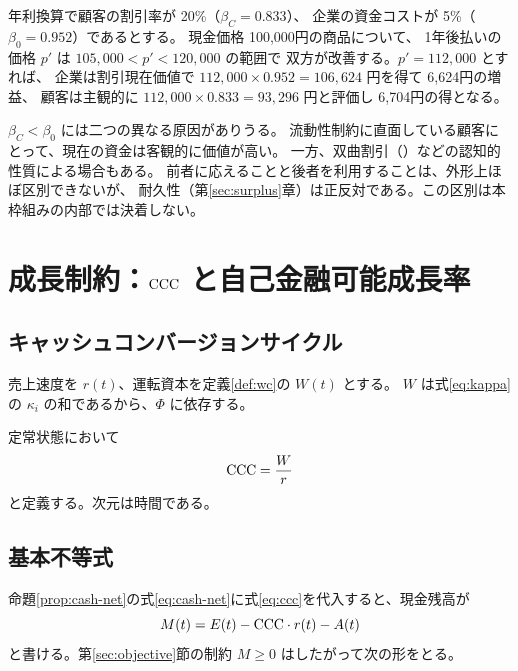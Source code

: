 \begin{example}[割賦の利得]
年利換算で顧客の割引率が 20\%（$\beta_C=0.833$）、
企業の資金コストが 5\%（$\beta_0=0.952$）であるとする。
現金価格 100,000円の商品について、
1年後払いの価格 $p'$ は $105{,}000 < p' < 120{,}000$ の範囲で
双方が改善する。$p'=112{,}000$ とすれば、
企業は割引現在価値で $112{,}000\times 0.952 = 106{,}624$ 円を得て 6,624円の増益、
顧客は主観的に $112{,}000\times 0.833=93{,}296$ 円と評価し 6,704円の得となる。
\end{example}

\begin{remark}[解釈の分岐]
$\beta_C<\beta_0$ には二つの異なる原因がありうる。
流動性制約に直面している顧客にとって、現在の資金は客観的に価値が高い。
一方、双曲割引（\cite{laibson1997}）などの認知的性質による場合もある。
前者に応えることと後者を利用することは、外形上ほぼ区別できないが、
耐久性（第\ref{sec:surplus}章）は正反対である。この区別は本枠組みの内部では決着しない。
\end{remark}

\chapter{成長制約：\texorpdfstring{$\mathrm{CCC}$}{CCC} と自己金融可能成長率}
\label{sec:growth}

\section{キャッシュコンバージョンサイクル}
\label{sec:ccc-def}

売上速度を $r(t)$、運転資本を定義\ref{def:wc}の $W(t)$ とする。
$W$ は式\eqref{eq:kappa}の $\kappa_i$ の和であるから、$\Phi$ に依存する。

\begin{definition}[キャッシュコンバージョンサイクル]
定常状態において
\begin{equation}
\mathrm{CCC} = \frac{W}{r}
\label{eq:ccc}
\end{equation}
と定義する。次元は時間である。
\end{definition}

\section{基本不等式}
\label{sec:fundamental}

命題\ref{prop:cash-net}の式\eqref{eq:cash-net}に式\eqref{eq:ccc}を代入すると、現金残高が
\begin{equation}
M(t) = E(t) - \mathrm{CCC}\cdot r(t) - A(t)
\label{eq:M-ccc}
\end{equation}
と書ける。第\ref{sec:objective}節の制約 $M\geq 0$ はしたがって次の形をとる。

